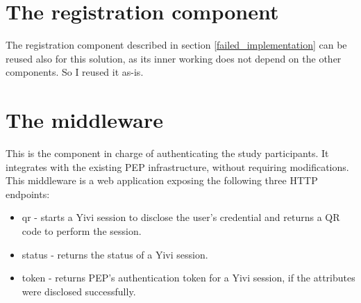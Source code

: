 \documentclass{report}
\begin{document}
\section{The registration component}
The registration component described in section \ref{failed_implementation} can be reused also for this solution, as its inner working does not depend on the other components. So I
reused it as-is.

\section{The middleware}\label{middleware}
This is the component in charge of authenticating the study participants. It integrates with the existing PEP infrastructure, without requiring modifications. This middleware is a web 
application exposing the following three HTTP endpoints:

\begin{itemize}
	\item qr - starts a Yivi session to disclose the user's credential and returns a QR code to perform the session.
	\item status - returns the status of a Yivi session.
	\item token - returns PEP's authentication token for a Yivi session, if the attributes were disclosed successfully.
\end{itemize}
\end{document}
